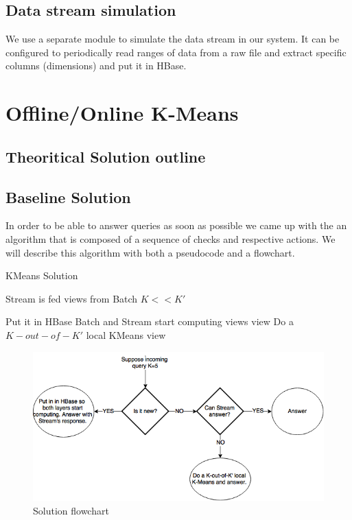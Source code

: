 \documentclass{lmproj}
\begin{document}
\section{Data stream simulation}
\label{systemdescr}
We use a separate module to simulate the data stream in our system. It can be configured to periodically read ranges of data from a raw file and extract specific columns (dimensions) and put it in HBase. 



\chapter{Offline/Online K-Means}
\label{kmeans}

\section{Theoritical Solution outline}
\label{kmeans}

\section{Baseline Solution}
\label{kmeans}

In order to be able to answer queries as soon as possible we came up with the an algorithm that is composed of a sequence of checks and respective actions. We will describe this algorithm with both a pseudocode and a flowchart.


\bigskip


	\begin{algorithm}[H]
		\caption{KMeans Solution}\label{kmeanssolution}
		\begin{algorithmic}[1]
			\Require Stream is fed views from Batch
			\Require $K<<K'$
			
				\State Put it in HBase
				\State Batch and Stream start computing views
			\Else 
					\State \Return view
				\Else 
					\State Do a $K-out-of-K'$ local KMeans
					\State \Return view
				\EndIf
			\EndIf			
			
			\EndProcedure
		\end{algorithmic}
	\end{algorithm}



\begin{figure}[H]
	\centering	
	\includegraphics[scale=0.5]{usecase}
	\caption{Solution flowchart}
\end{figure}
\end{document}
